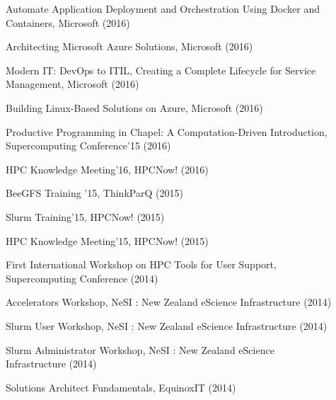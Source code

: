\begin{description}
  \item[] Automate Application Deployment and Orchestration Using Docker and Containers, Microsoft (2016)
  \item[] Architecting Microsoft Azure Solutions, Microsoft (2016)
  \item[] Modern IT: DevOps to ITIL, Creating a Complete Lifecycle for Service Management, Microsoft (2016)
  \item[] Building Linux-Based Solutions on Azure, Microsoft (2016)
  \item[] Productive Programming in Chapel: A Computation-Driven Introduction, Supercomputing Conference'15 (2016)
  \item[] HPC Knowledge Meeting'16, HPCNow! (2016)
  \item[] BeeGFS Training '15, ThinkParQ (2015)
  \item[] Slurm Training'15, HPCNow! (2015)
  \item[] HPC Knowledge Meeting'15, HPCNow! (2015)
  \item[] First International Workshop on HPC Tools for User Support, Supercomputing Conference (2014)
  \item[] Accelerators Workshop, NeSI : New Zealand eScience Infrastructure (2014)
  \item[] Slurm User Workshop, NeSI : New Zealand eScience Infrastructure (2014)
  \item[] Slurm Administrator Workshop, NeSI : New Zealand eScience Infrastructure (2014)
  \item[] Solutions Architect Fundamentals, EquinoxIT (2014)
\end{description}
